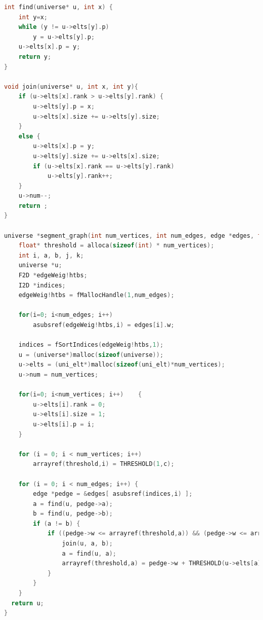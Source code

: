 \begin{appendices}
\begin{lstlisting}[language=C,basicstyle=\small]
\end{lstlisting}
\label{lsting:mser}

\begin{lstlisting}[language=C,basicstyle=\small]
int find(universe* u, int x) {
    int y=x;
    while (y != u->elts[y].p)
        y = u->elts[y].p;
    u->elts[x].p = y;
    return y;
}

void join(universe* u, int x, int y){
    if (u->elts[x].rank > u->elts[y].rank) {
        u->elts[y].p = x;
        u->elts[x].size += u->elts[y].size;
    } 
    else {
        u->elts[x].p = y;
        u->elts[y].size += u->elts[x].size;
        if (u->elts[x].rank == u->elts[y].rank)
            u->elts[y].rank++;
    }
    u->num--;
    return ;
}

universe *segment_graph(int num_vertices, int num_edges, edge *edges, float c) { 
    float* threshold = alloca(sizeof(int) * num_vertices);
    int i, a, b, j, k;
    universe *u;
    F2D *edgeWeig!htbs;
    I2D *indices;
    edgeWeig!htbs = fMallocHandle(1,num_edges);

    for(i=0; i<num_edges; i++)
        asubsref(edgeWeig!htbs,i) = edges[i].w;

    indices = fSortIndices(edgeWeig!htbs,1);
    u = (universe*)malloc(sizeof(universe));
    u->elts = (uni_elt*)malloc(sizeof(uni_elt)*num_vertices);
    u->num = num_vertices;
	
    for(i=0; i<num_vertices; i++)    {
        u->elts[i].rank = 0;
        u->elts[i].size = 1;
        u->elts[i].p = i;
    }

    for (i = 0; i < num_vertices; i++)
        arrayref(threshold,i) = THRESHOLD(1,c);

    for (i = 0; i < num_edges; i++) {
        edge *pedge = &edges[ asubsref(indices,i) ];
		a = find(u, pedge->a);
        b = find(u, pedge->b);
        if (a != b) {
            if ((pedge->w <= arrayref(threshold,a)) && (pedge->w <= arrayref(threshold,b))) {
	            join(u, a, b);
	            a = find(u, a);
	            arrayref(threshold,a) = pedge->w + THRESHOLD(u->elts[a].size, c);
            }
        }
    }
  return u;
}
\end{lstlisting}
\label{lsting:multi}
\end{appendices}